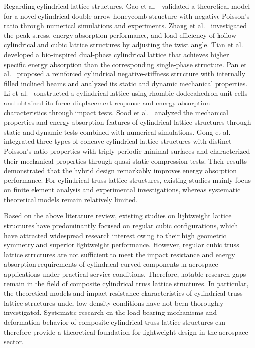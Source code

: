 \documentclass[12pt,a4paper]{article}
\numberwithin{equation}{section}
\begin{document}
	Regarding cylindrical lattice structures, Gao et al.~\cite{Ref44} validated a theoretical model for a novel cylindrical double-arrow honeycomb structure with negative Poisson's ratio through numerical simulations and experiments. Zhang et al.~\cite{Ref45} investigated the peak stress, energy absorption performance, and load efficiency of hollow cylindrical and cubic lattice structures by adjusting the twist angle. Tian et al.~\cite{Ref46} developed a bio-inspired dual-phase cylindrical lattice that achieves higher specific energy absorption than the corresponding single-phase structure. Pan et al.~\cite{Ref47} proposed a reinforced cylindrical negative-stiffness structure with internally filled inclined beams and analyzed its static and dynamic mechanical properties. Li et al.~\cite{Ref48} constructed a cylindrical lattice using rhombic dodecahedron unit cells and obtained its force--displacement response and energy absorption characteristics through impact tests. Sood et al.~\cite{Ref49} analyzed the mechanical properties and energy absorption features of cylindrical lattice structures through static and dynamic tests combined with numerical simulations.
	Gong et al.~\cite{RefGong} integrated three types of concave cylindrical lattice structures with distinct Poisson's ratio properties with triply periodic minimal surfaces and characterized their mechanical properties through quasi-static compression tests. Their results demonstrated that the hybrid design remarkably improves energy absorption performance. For cylindrical truss lattice structures, existing studies mainly focus on finite element analysis and experimental investigations, whereas systematic theoretical models remain relatively limited.
	
	Based on the above literature review, existing studies on lightweight lattice structures have predominantly focused on regular cubic configurations, which have attracted widespread research interest owing to their high geometric symmetry and superior lightweight performance. However, regular cubic truss lattice structures are not sufficient to meet the impact resistance and energy absorption requirements of cylindrical curved components in aerospace applications under practical service conditions. Therefore, notable research gaps remain in the field of composite cylindrical truss lattice structures. In particular, the theoretical models and impact resistance characteristics of cylindrical truss lattice structures under low-density conditions have not been thoroughly investigated. Systematic research on the load-bearing mechanisms and deformation behavior of composite cylindrical truss lattice structures can therefore provide a theoretical foundation for lightweight design in the aerospace sector.
	
\end{document}
